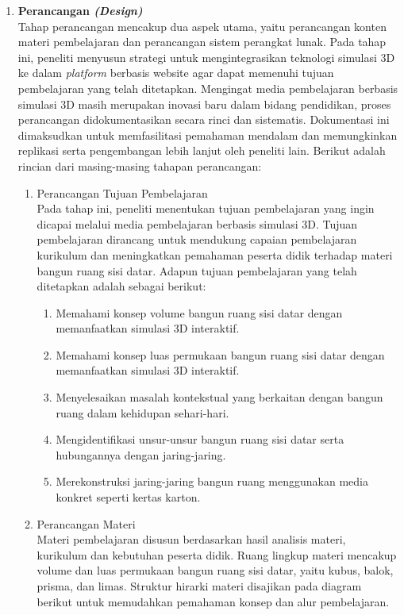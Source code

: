 \begin{enumerate}[leftmargin=1cm, label=\arabic*.]
    \item \textbf{Perancangan \textit{(Design)}}\\
    \hspace*{1cm}Tahap perancangan mencakup dua aspek utama, yaitu perancangan konten materi pembelajaran dan perancangan sistem perangkat lunak. Pada tahap ini, peneliti menyusun strategi untuk mengintegrasikan teknologi simulasi 3D ke dalam \textit{platform} berbasis website agar dapat memenuhi tujuan pembelajaran yang telah ditetapkan. Mengingat media pembelajaran berbasis simulasi 3D masih merupakan inovasi baru dalam bidang pendidikan, proses perancangan didokumentasikan secara rinci dan sistematis. Dokumentasi ini dimaksudkan untuk memfasilitasi pemahaman mendalam dan memungkinkan replikasi serta pengembangan lebih lanjut oleh peneliti lain. Berikut adalah rincian dari masing-masing tahapan perancangan:
    \begin{enumerate}
        \item Perancangan Tujuan Pembelajaran \\
        \hspace*{1cm}Pada tahap ini, peneliti menentukan tujuan pembelajaran yang ingin dicapai melalui media pembelajaran berbasis simulasi 3D. Tujuan pembelajaran dirancang untuk mendukung capaian pembelajaran kurikulum dan meningkatkan pemahaman peserta didik terhadap materi bangun ruang sisi datar. Adapun tujuan pembelajaran yang telah ditetapkan adalah sebagai berikut:
        \begin{enumerate}
            \item Memahami konsep volume bangun ruang sisi datar dengan memanfaatkan simulasi 3D interaktif.
            \item Memahami konsep luas permukaan bangun ruang sisi datar dengan memanfaatkan simulasi 3D interaktif.
            \item Menyelesaikan masalah kontekstual yang berkaitan dengan bangun ruang dalam kehidupan sehari-hari.
            \item Mengidentifikasi unsur-unsur bangun ruang sisi datar serta hubungannya dengan jaring-jaring.
            \item Merekonstruksi jaring-jaring bangun ruang menggunakan media konkret seperti kertas karton.
        \end{enumerate}
        \item Perancangan Materi \\
        \hspace*{1cm}Materi pembelajaran disusun berdasarkan hasil analisis materi, kurikulum dan kebutuhan peserta didik. Ruang lingkup materi mencakup volume dan luas permukaan bangun ruang sisi datar, yaitu kubus, balok, prisma, dan limas. Struktur hirarki materi disajikan pada diagram berikut untuk memudahkan pemahaman konsep dan alur pembelajaran.

\end{enumerate}
\end{enumerate}
